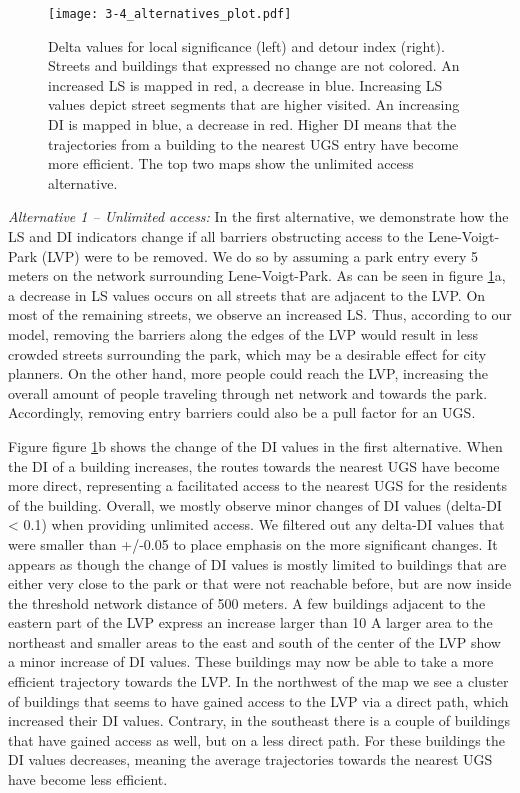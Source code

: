 \documentclass[10pt]{article}
\begin{document}
\begin{figure}
\centering
\texttt{[image: 3-4\_alternatives\_plot.pdf]}
\caption{Delta values for local significance (left) and detour index (right). Streets and buildings that expressed no change are not colored. An increased LS is mapped in red, a decrease in blue. Increasing LS values depict street segments that are higher visited. An increasing DI is mapped in blue, a decrease in red. Higher DI means that the trajectories from a building to the nearest UGS entry have become more efficient. The top two maps show the unlimited access alternative.}
\label{fig:alt}
\end{figure}

\textit{Alternative 1 – Unlimited access:} In the first alternative, we demonstrate how the LS and DI indicators change if all barriers obstructing access to the Lene-Voigt-Park (LVP) were to be removed.
We do so by assuming a park entry every 5 meters on the network surrounding Lene-Voigt-Park.
As can be seen in figure \ref{fig:alt}a, a decrease in LS values occurs on all streets that are adjacent to the LVP. 
On most of the remaining streets, we observe an increased LS.
Thus, according to our model, removing the barriers along the edges of the LVP would result in less crowded streets surrounding the park, which may be a desirable effect for city planners.
On the other hand, more people could reach the LVP, increasing the overall amount of people traveling through net network and towards the park. 
Accordingly, removing entry barriers could also be a pull factor for an UGS.

Figure figure \ref{fig:alt}b shows the change of the DI values in the first alternative.
When the DI of a building increases, the routes towards the nearest UGS have become more direct, representing a facilitated access to the nearest UGS for the residents of the building.
Overall, we mostly observe minor changes of DI values (delta-DI < 0.1) when providing unlimited access.
We filtered out any delta-DI values that were smaller than +/-0.05 to place emphasis on the more significant changes.
It appears as though the change of DI values is mostly limited to buildings that are either very close to the park or that were not reachable before, but are now inside the threshold network distance of 500 meters.
A few buildings adjacent to the eastern part of the LVP express an increase larger than 10%
A larger area to the northeast and smaller areas to the east and south of the center of the LVP show a minor increase of DI values. 
These buildings may now be able to take a more efficient trajectory towards the LVP.
In the northwest of the map we see a cluster of buildings that seems to have gained access to the LVP via a direct path, which increased their DI values.
Contrary, in the southeast there is a couple of buildings that have gained access as well, but on a less direct path.
For these buildings the DI values decreases, meaning the average trajectories towards the nearest UGS have become less efficient.
\end{document}
